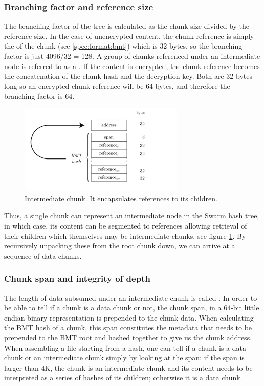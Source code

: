 \subsubsection{Branching factor and reference size}

The branching factor of the tree is calculated as the chunk size divided by the reference size. In the case of unencrypted content, the chunk reference is simply the  of the chunk (see \ref{spec:format:bmt}) which is 32 bytes, so the branching factor is just 4096/32 =  128. A group of chunks referenced under an intermediate node is referred to as a . If the content is encrypted, the chunk reference becomes the concatenation of the chunk hash and the decryption key. Both are 32 bytes long so an encrypted chunk reference will be 64 bytes, and therefore the branching factor is 64. 


\begin{figure}[htbp]
\centering
\includegraphics[width=0.7\textwidth]{fig/intermediate-chunk-3.pdf}
\caption[Intermediate chunk \statusgreen]{Intermediate chunk. It encapsulates references to its children.}
\label{fig:intermediate-chunk}
\end{figure}

Thus, a single chunk can represent an intermediate node in the Swarm hash tree, in which case, its content can be segmented to references allowing retrieval of their children which themselves may be intermediate chunks, see figure \ref{fig:intermediate-chunk}. By recursively unpacking these from the root chunk down, we can arrive at a sequence of data chunks. 

 \subsubsection{Chunk span and integrity of depth}

The length of data subsumed under an intermediate chunk is called . In order to be able to tell if a chunk is a data chunk or not, the chunk span, in a 64-bit little endian binary representation is prepended to the chunk data.  When calculating the BMT hash of a chunk, this span constitutes the metadata that needs to be prepended to the BMT root and hashed together to give us the chunk address. When assembling a file starting from a hash, one can tell if a chunk is a data chunk or an intermediate chunk simply by looking at the span: if the span is larger than 4K, the chunk is an intermediate chunk and its content needs to be interpreted as a series of hashes of its children; otherwise it is a data chunk.

